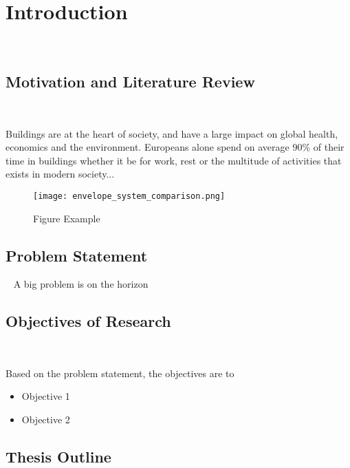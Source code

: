 
\chapter{Introduction}\
\label{ch:introduction}



\section{Motivation and Literature Review}\
\label{ch:motivation}

Buildings are at the heart of society, and have a large impact on global health, economics and the environment. Europeans alone spend on average 90\% of their time in buildings \cite{Staniaszek2014BPIE} whether it be for work, rest or the multitude of activities that exists in modern society...\\

  \begin{figure}[ht] %
    \begin{center}
      \texttt{[image: envelope\_system\_comparison.png]}
      \caption{Figure Example}
      \label{fig: comparison}
    \end{center} 
  \end{figure}

 
\section{Problem Statement}\
A big problem is on the horizon


\section{Objectives of Research}\

Based on the problem statement, the objectives are to

\begin{itemize}
	\item Objective 1
	\item Objective 2
\end{itemize}


\section{Thesis Outline}\


